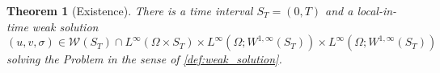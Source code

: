 \documentclass[reqno, 11pt]{amsart}
\newtheorem{thm}{Theorem}[section]
\numberwithin{equation}{section}
\begin{document}


\begin{thm}[Existence]\label{thm.existence}
There is a time interval $S_T=(0,T)$ and a local-in-time weak solution 
\[
(u,v,\sigma)\in \mathcal{W}(S_T)\cap L^\infty(\Omega\times S_T)\times L^\infty(\Omega;W^{1,\infty}(S_T))\times L^\infty(\Omega;W^{1,\infty}(S_T))
\]
solving the Problem in the sense of \cref{def:weak_solution}.
\end{thm}
%
\end{document}
